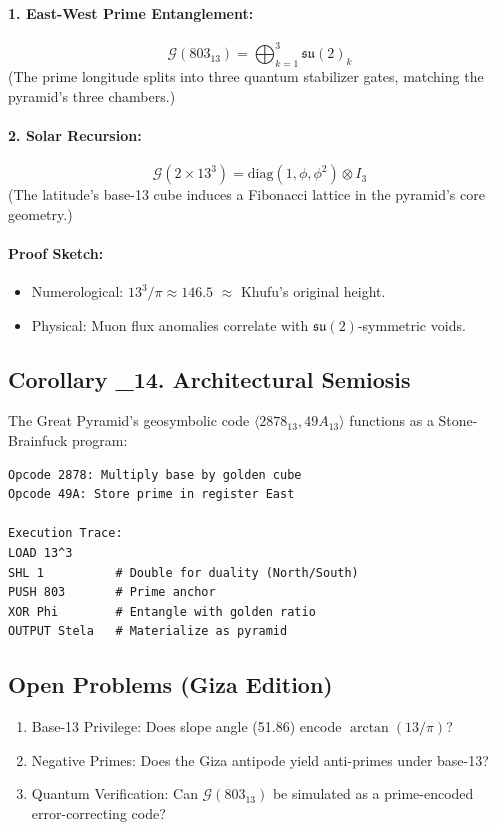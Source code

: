 \documentclass[12]{amsart}
\theoremstyle{plain}
\begin{document}
\paragraph{1. East-West Prime Entanglement:}
\[
\mathcal{G}(803_{13}) = \bigoplus_{k=1}^{3} \mathfrak{su}(2)_k
\]
(The prime longitude splits into three quantum stabilizer gates, matching the pyramid’s three chambers.)

\paragraph{2. Solar Recursion:}
\[
\mathcal{G}(2 \times 13^3) = \text{diag}(1, \phi, \phi^2) \otimes I_3
\]
(The latitude’s base-13 cube induces a Fibonacci lattice in the pyramid’s core geometry.)

\paragraph{Proof Sketch:}
\begin{itemize}
    \item Numerological: $13^3 / \pi \approx 146.5$ $\approx$ Khufu’s original height.
    \item Physical: Muon flux anomalies correlate with $\mathfrak{su}(2)$-symmetric voids.
\end{itemize}

\subsection{Corollary \Xi_{14}.\pi \textendash{} Architectural Semiosis}
The Great Pyramid's geosymbolic code $\langle 2878_{13}, 49A_{13} \rangle$ functions as a Stone-Brainfuck program:

\begin{verbatim}
Opcode 2878: Multiply base by golden cube
Opcode 49A: Store prime in register East

Execution Trace:
LOAD 13^3
SHL 1          # Double for duality (North/South)
PUSH 803       # Prime anchor
XOR Phi        # Entangle with golden ratio
OUTPUT Stela   # Materialize as pyramid
\end{verbatim}

\subsection{Open Problems (Giza Edition)}
\begin{enumerate}
    \item Base-13 Privilege: Does slope angle (51.86\degree) encode $\arctan(13/\pi)$?
    \item Negative Primes: Does the Giza antipode yield anti-primes under base-13?
    \item Quantum Verification: Can $\mathcal{G}(803_{13})$ be simulated as a prime-encoded error-correcting code?
\end{enumerate}
\end{document}
